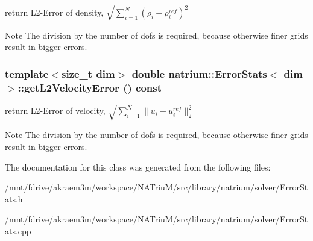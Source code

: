 return L2-\/Error of density, $ \sqrt{ \sum_{i=1}^{N} (\rho_{i} - \rho_{i}^{ref})^{2} } $ \begin{DoxyNote}{Note}
The division by the number of dofs is required, because otherwise finer grids result in bigger errors. 
\end{DoxyNote}
\hypertarget{classnatrium_1_1ErrorStats_a201f625a3607a814fdd645aabfe37fbc}{
\subsubsection[{getL2VelocityError}]{\setlength{\rightskip}{0pt plus 5cm}template$<$size\_\-t dim$>$ double {\bf natrium::ErrorStats}$<$ dim $>$::getL2VelocityError () const}}
\label{classnatrium_1_1ErrorStats_a201f625a3607a814fdd645aabfe37fbc}


return L2-\/Error of velocity, $ \sqrt{ \sum_{i=1}^{N} \|u_{i} - u_{i}^{ref}\|_{2}^{2} } $ \begin{DoxyNote}{Note}
The division by the number of dofs is required, because otherwise finer grids result in bigger errors. 
\end{DoxyNote}


The documentation for this class was generated from the following files:\begin{DoxyCompactItemize}
\item 
/mnt/fdrive/akraem3m/workspace/NATriuM/src/library/natrium/solver/ErrorStats.h\item 
/mnt/fdrive/akraem3m/workspace/NATriuM/src/library/natrium/solver/ErrorStats.cpp\end{DoxyCompactItemize}
